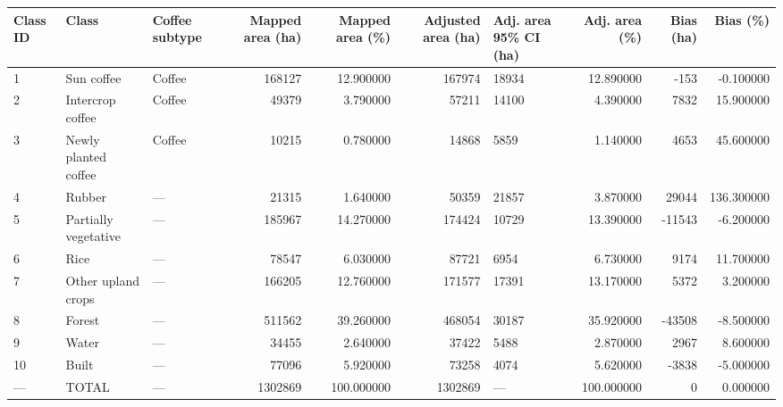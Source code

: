 \begin{tabular}{lllrrrlrrr}
\toprule
Class ID & Class & Coffee subtype & Mapped area (ha) & Mapped area (\%) & Adjusted area (ha) & Adj. area 95\% CI (ha) & Adj. area (\%) & Bias (ha) & Bias (\%) \\
\midrule
1 & Sun coffee & Coffee & 168127 & 12.900000 & 167974 & 18934 & 12.890000 & -153 & -0.100000 \\
2 & Intercrop coffee & Coffee & 49379 & 3.790000 & 57211 & 14100 & 4.390000 & 7832 & 15.900000 \\
3 & Newly planted coffee & Coffee & 10215 & 0.780000 & 14868 & 5859 & 1.140000 & 4653 & 45.600000 \\
4 & Rubber & — & 21315 & 1.640000 & 50359 & 21857 & 3.870000 & 29044 & 136.300000 \\
5 & Partially vegetative & — & 185967 & 14.270000 & 174424 & 10729 & 13.390000 & -11543 & -6.200000 \\
6 & Rice & — & 78547 & 6.030000 & 87721 & 6954 & 6.730000 & 9174 & 11.700000 \\
7 & Other upland crops & — & 166205 & 12.760000 & 171577 & 17391 & 13.170000 & 5372 & 3.200000 \\
8 & Forest & — & 511562 & 39.260000 & 468054 & 30187 & 35.920000 & -43508 & -8.500000 \\
9 & Water & — & 34455 & 2.640000 & 37422 & 5488 & 2.870000 & 2967 & 8.600000 \\
10 & Built & — & 77096 & 5.920000 & 73258 & 4074 & 5.620000 & -3838 & -5.000000 \\
— & TOTAL & — & 1302869 & 100.000000 & 1302869 & — & 100.000000 & 0 & 0.000000 \\
\bottomrule
\end{tabular}
